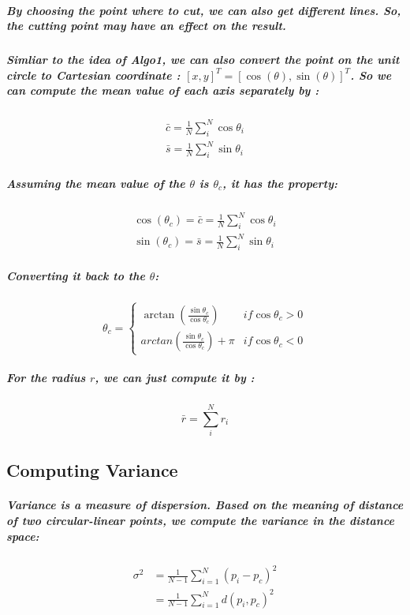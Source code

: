 \documentclass{article}
\begin{document}
\subparagraph{
By choosing the point where to cut, we can also get different lines. So, the cutting point may have an effect on the result.
}

\subparagraph{
Simliar to the idea of \textit{Algo1}, we can also convert the point on the unit circle to Cartesian coordinate : $[x,y]^T = [\cos(\theta), \sin(\theta)]^T$. So we can compute the mean value of each axis separately by :
}

\begin{equation}
\begin{aligned}
\bar{c} = \frac{1}{N} \sum_{i}^{N}\cos{\theta_{i}} \\
\bar{s} = \frac{1}{N} \sum_{i}^{N}\sin{\theta_{i}}
\end{aligned}
\end{equation}

\subparagraph{
Assuming the mean value of the $\theta$ is $\theta_{c}$, it has the property:
}

\begin{equation}
    \begin{aligned}
    \cos(\theta_c) = \bar{c} = \frac{1}{N} \sum_{i}^{N}\cos{\theta_{i}} \\
    \sin(\theta_c) = \bar{s} = \frac{1}{N} \sum_{i}^{N}\sin{\theta_{i}}
    \end{aligned}
\end{equation}

\subparagraph{
Converting it back to the $\theta$:
}

\begin{equation}
\theta_c =
    \begin{cases}
        \arctan{(\frac{\sin{\theta_c}}{\cos{\theta_c}})} &if \cos{\theta_c} >0\\
        arctan{(\frac{\sin{\theta_c}}{\cos{\theta_c}})}+\pi &if \cos{\theta_c} <0
    \end{cases}
\end{equation}

\subparagraph{
For the radius $r$, we can just compute it by :\\
}

\begin{equation}
    \bar{r} = \sum_{i}^{N}r_i
\end{equation}

\subsection{Computing Variance}
\subparagraph{
Variance is a measure of dispersion. Based on the meaning of distance of two circular-linear points, we compute the variance in the distance space:
}
\begin{equation}
    \begin{aligned}
    \sigma^2 &= \frac{1}{N-1}\sum_{i=1}^{N}(p_i - p_c)^2\\
            &=\frac{1}{N-1}\sum_{i=1}^{N}d(p_i, p_c)^2
    \end{aligned}
\end{equation}
\end{document}
